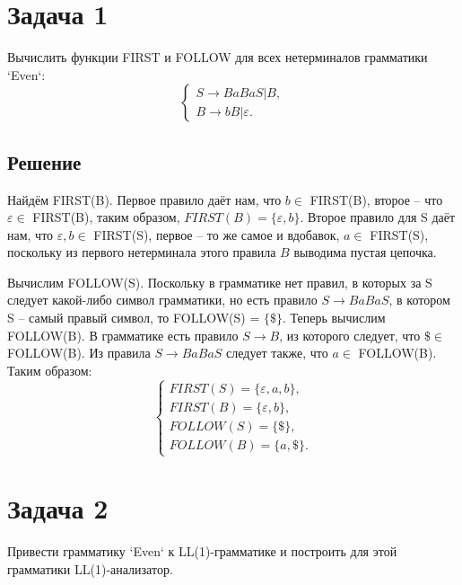 \documentclass[11pt]{article}
\author{Sergey Makarov}
\date{\today}
\title{}
\begin{document}
\section{Задача 1}
\label{sec:org9b70f6d}
Вычислить функции FIRST и FOLLOW для всех нетерминалов грамматики `Even`:
\begin{equation}
\begin{cases}
S \rightarrow BaBaS | B, \\
B \rightarrow bB | \varepsilon.
\end{cases}
\end{equation}
\subsection{Решение}
\label{sec:org19baf43}
Найдём FIRST(B). Первое правило даёт нам, что $b \in$ FIRST(B), второе -- что $\varepsilon \in$ FIRST(B),
таким образом, $FIRST(B) = \{\varepsilon, b\}$. Второе правило для S даёт нам, что $\varepsilon, b \in$ FIRST(S),
первое -- то же самое и вдобавок, $a \in$ FIRST(S), поскольку из первого нетерминала этого
правила $B$ выводима пустая цепочка.

Вычислим FOLLOW(S). Поскольку в грамматике нет правил, в которых за S следует какой-либо символ грамматики, но
есть правило $S \rightarrow BaBaS$, в котором S -- самый правый символ, то FOLLOW(S) = $\{\$\}$. Теперь вычислим
FOLLOW(B). В грамматике есть правило $S \rightarrow B$, из которого следует, что $\$ \in$ FOLLOW(B). Из правила
$S \rightarrow BaBaS$ следует также, что $a \in$ FOLLOW(B). Таким образом:
\begin{equation}
\begin{cases}
FIRST(S) = \{\varepsilon, a, b\}, \\
FIRST(B) = \{\varepsilon, b\}, \\
FOLLOW(S) = \{\$\}, \\
FOLLOW(B) = \{a, \$\}.
\end{cases}
\end{equation}
\section{Задача 2}
\label{sec:orga83ce67}
Привести грамматику `Even` к LL(1)-грамматике и построить для этой грамматики LL(1)-анализатор.
\end{document}
